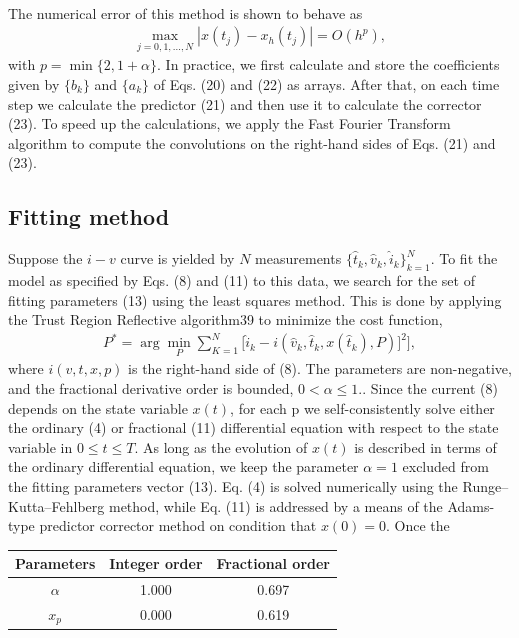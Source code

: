 \documentclass[10pt]{article}
\begin{document}
\begin{multicols}{2}
\begin{align}
\end{align}
The numerical error of this method is shown to behave as
\begin{align}
   \max_{j=0,1,...,N} |x(t_j)-x_h(t_j)|=O(h^p),
\end{align}
with $p=\min\{2,1+\alpha\}$. In practice, we first calculate and store the coefficients given by $\{b_k\}$ and $\{a_k\}$ of Eqs. (20) and (22) as arrays. After that, on each time step we calculate the predictor (21) and then use it to calculate the corrector (23). To speed up the calculations, we apply the Fast Fourier Transform algorithm to compute the convolutions on the right-hand sides of Eqs. (21) and (23).
{\centering \subsection{Fitting method}}
Suppose the $i-v$ curve is yielded by $N$ measurements $\{\hat{t}_k, \hat{v}_k, \hat{i}_k\}_{k=1}^N$. To fit the model as specified by Eqs. (8) and (11) to this data, we search for the set of fitting
parameters (13) using the least squares method. This is done by applying the Trust Region Reflective algorithm39 to minimize the cost function,
\begin{align}
   P^* = \arg \min_P \sum_{K=1}^N \biggl[\hat{i}_k-i(\hat{v}_k,\hat{t}_k, x(\hat{t}_k),P)]^2 \biggr],
\end{align}
where $i(v, t, x, p)$ is the right-hand side of (8). The parameters are non-negative, and the fractional derivative order is bounded, $0 < \alpha \le 1.$. Since the current (8) depends on the state variable $x(t)$, for each p we self-consistently solve either the ordinary (4) or fractional (11) differential equation with respect to the state variable in $0 \le t \le T$. As long as the evolution of $x(t)$ is described in terms of the ordinary differential equation, we keep the parameter $\alpha = 1$ excluded from the fitting parameters vector (13). Eq. (4) is solved numerically using the Runge–Kutta–Fehlberg method, while Eq. (11) is addressed by a means of the Adams-type predictor corrector method on condition that $x(0) = 0$. Once the \\
{
\begin{center}
\begin{tabular}{c c c}
    \hline
    \hline
    Parameters & Integer order & Fractional order \\
    \hline
    $\alpha$ & 1.000 & 0.697 \\
    $x_p$ & 0.000 & 0.619 \\

\end{tabular}
\end{center}}
\end{multicols}
\end{document}
